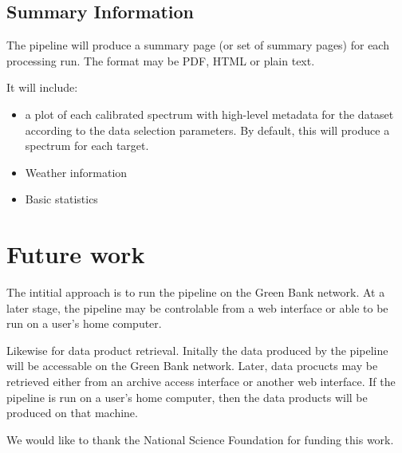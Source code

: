\documentclass[11pt,twoside]{article}
\begin{document}
\subsection{Summary Information}

The pipeline will produce a summary page (or set of summary pages) for each processing run.  The format may be PDF, HTML or plain text.

It will include:
\begin{itemize}
\item a plot of each calibrated spectrum with high-level metadata for the dataset according to the data selection parameters.  By default, this will produce a spectrum for each target.
\item Weather information
\item Basic statistics
\end{itemize}

\section{Future work}

The intitial approach is to run the pipeline on the Green Bank network.  At a later stage, the pipeline may be controlable from a web interface or able to be run on a user's home computer.

Likewise for data product retrieval.  Initally the data produced by the pipeline will be accessable on the Green Bank network.  Later, data procucts may be retrieved either from an archive access interface or another web interface.  If the pipeline is run on a user's home computer, then the data products will be produced on that machine.

\acknowledgements We would like to thank the National Science Foundation for funding this work.


\end{document}

